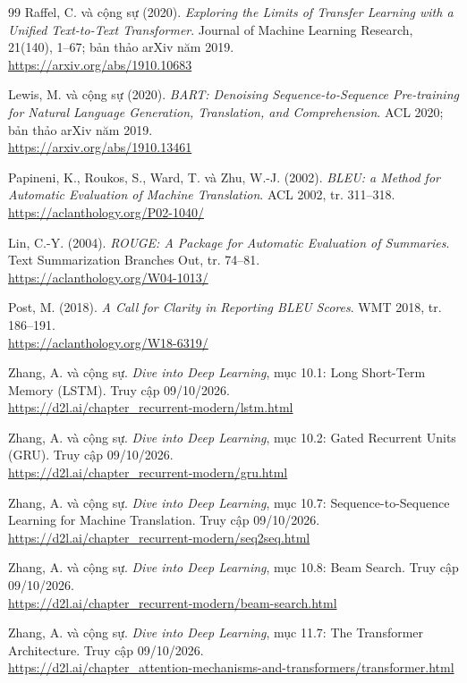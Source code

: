 \documentclass[11pt,a4paper]{article}
\numberwithin{equation}{section}
\begin{document}
\begin{thebibliography}{99}
 Raffel, C. và cộng sự (2020). \emph{Exploring the Limits of Transfer Learning with a Unified Text-to-Text Transformer}. Journal of Machine Learning Research, 21(140), 1--67; bản thảo arXiv năm 2019.\\
\url{https://arxiv.org/abs/1910.10683}

 Lewis, M. và cộng sự (2020). \emph{BART: Denoising Sequence-to-Sequence Pre-training for Natural Language Generation, Translation, and Comprehension}. ACL 2020; bản thảo arXiv năm 2019.\\
\url{https://arxiv.org/abs/1910.13461}

 Papineni, K., Roukos, S., Ward, T. và Zhu, W.-J. (2002). \emph{BLEU: a Method for Automatic Evaluation of Machine Translation}. ACL 2002, tr. 311--318.\\
\url{https://aclanthology.org/P02-1040/}

 Lin, C.-Y. (2004). \emph{ROUGE: A Package for Automatic Evaluation of Summaries}. Text Summarization Branches Out, tr. 74--81.\\
\url{https://aclanthology.org/W04-1013/}

 Post, M. (2018). \emph{A Call for Clarity in Reporting BLEU Scores}. WMT 2018, tr. 186--191.\\
\url{https://aclanthology.org/W18-6319/}

 Zhang, A. và cộng sự. \emph{Dive into Deep Learning}, mục 10.1: Long Short-Term Memory (LSTM). Truy cập 09/10/2026.\\
\url{https://d2l.ai/chapter_recurrent-modern/lstm.html}

 Zhang, A. và cộng sự. \emph{Dive into Deep Learning}, mục 10.2: Gated Recurrent Units (GRU). Truy cập 09/10/2026.\\
\url{https://d2l.ai/chapter_recurrent-modern/gru.html}

 Zhang, A. và cộng sự. \emph{Dive into Deep Learning}, mục 10.7: Sequence-to-Sequence Learning for Machine Translation. Truy cập 09/10/2026.\\
\url{https://d2l.ai/chapter_recurrent-modern/seq2seq.html}

 Zhang, A. và cộng sự. \emph{Dive into Deep Learning}, mục 10.8: Beam Search. Truy cập 09/10/2026.\\
\url{https://d2l.ai/chapter_recurrent-modern/beam-search.html}

 Zhang, A. và cộng sự. \emph{Dive into Deep Learning}, mục 11.7: The Transformer Architecture. Truy cập 09/10/2026.\\
\url{https://d2l.ai/chapter_attention-mechanisms-and-transformers/transformer.html}


\end{thebibliography}
\end{document}
